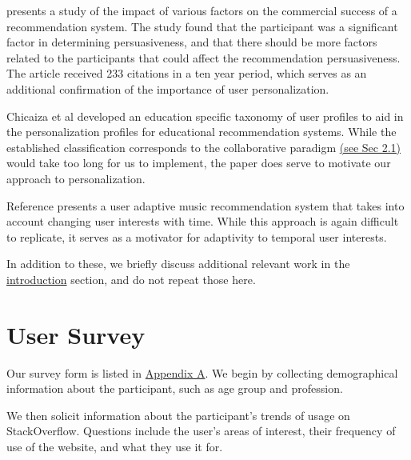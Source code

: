 \documentclass{sig-alternate-05-2015}
\begin{document}
\cite{18} presents a study of the impact of various factors on the commercial success of a recommendation system. The study found that the participant was a significant factor in determining persuasiveness, and that there should be more factors related to the participants that could affect the recommendation persuasiveness. The article received 233 citations in a ten year period, which serves as an additional confirmation of the importance of user personalization.

Chicaiza et al\cite{19} developed an education specific taxonomy of user profiles to aid in the personalization profiles for educational recommendation systems. While the established classification corresponds to the collaborative paradigm \hyperref[lit]{(see Sec 2.1)} would take too long for us to implement, the paper does serve to motivate our approach to personalization.

Reference\cite{20} presents a user adaptive music recommendation system that takes into account changing user interests with time. While this approach is again difficult to replicate, it serves as a motivator for adaptivity to temporal user interests.

In addition to these, we briefly discuss additional relevant work in the \hyperref[intro]{introduction} section, and do not repeat those here.



\section{User Survey}
\label{sec:hello}


Our survey form is listed in \hyperref[app]{Appendix A}. We begin by collecting demographical information about the participant, such as age group and profession. 

We then solicit information about the participant's trends of usage on StackOverflow. Questions include the user's areas of interest, their frequency of use of the website, and what they use it for.
\end{document}
